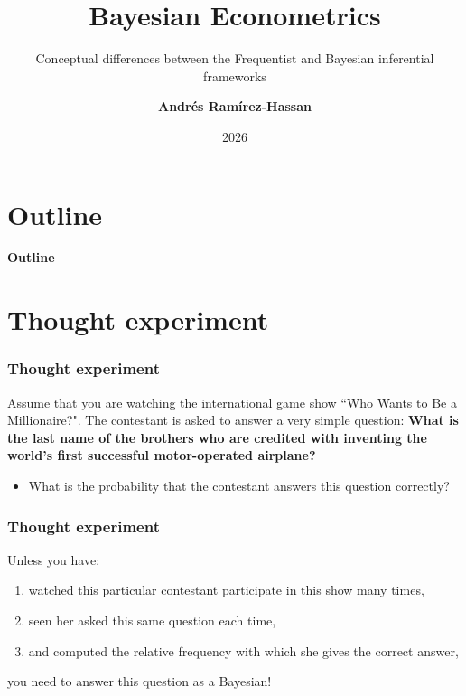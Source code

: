 \documentclass[12pt, compress]{beamer}
\title{Bayesian Econometrics}
\subtitle{Conceptual differences between the Frequentist and Bayesian inferential frameworks}
\date{2026} %
\author[Andr\'e Ram\'irez H.]{\textbf{Andr\'es Ram\'irez-Hassan}}
\institute[EAFIT]{\small{Universidad EAFIT\\School of Finance, Economics and Government}}
\begin{document}
\maketitle




\section*{Outline}
\begin{frame}
\textbf{\Large{Outline}}
\tableofcontents
\end{frame}

\section{Thought experiment}

\begin{frame}
	\frametitle{Thought experiment}
Assume that you are watching the international game show ``Who Wants to Be a Millionaire?". The contestant is asked to answer a very simple question: \textbf{What is the last name of the brothers who are credited with inventing the world's first successful motor-operated airplane?}

\begin{itemize}
	\item What is the probability that the contestant answers this question correctly? 
\end{itemize}
\end{frame}

\begin{frame}
	\frametitle{Thought experiment}
Unless you have: 

\begin{enumerate}
	\item watched this particular contestant participate in this show many times,
	\item seen her asked this same question each time, 
	\item and computed the relative frequency with which she gives the correct answer,   
\end{enumerate}

you need to answer this question as a Bayesian!
\end{frame}
\end{document}
